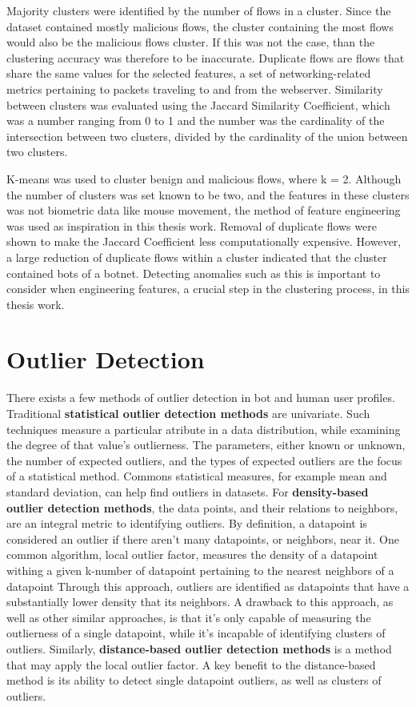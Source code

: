 Majority clusters were identified by the number of flows in a cluster.
Since the dataset contained mostly malicious flows, the cluster containing the most flows would also be the malicious flows cluster.
If this was not the case, than the clustering accuracy was therefore to be inaccurate.
Duplicate flows are flows that share the same values for the selected features, a set of networking-related metrics pertaining to packets traveling to and from the webserver.
Similarity between clusters was evaluated using the Jaccard Similarity Coefficient, which was a number ranging from 0 to 1 and the number was the cardinality of the intersection between two clusters, divided by the cardinality of the union between two clusters.

K-means was used to cluster benign and malicious flows, where k = 2.
Although the number of clusters was set known to be two, and the features in these clusters was not biometric data like mouse movement, the method of feature engineering was used as inspiration in this thesis work.
Removal of duplicate flows were shown to make the Jaccard Coefficient less computationally expensive.
However, a large reduction of duplicate flows within a cluster indicated that the cluster contained bots of a botnet.
Detecting anomalies such as this is important to consider when engineering features, a crucial step in the clustering process, in this thesis work.

\section{Outlier Detection}\label{sec:outlier-detection}
There exists a few methods of outlier detection in bot and human user profiles.
Traditional \textbf{statistical outlier detection methods} are univariate.
Such techniques measure a particular atribute in a data distribution, while examining the degree of that value's outlierness.
The parameters, either known or unknown, the number of expected outliers, and the types of expected outliers are the focus of a statistical method.
Commons statistical measures, for example mean and standard deviation, can help find outliers in datasets.
For \textbf{density-based outlier detection methods}, the data points, and their relations to neighbors, are an integral metric to identifying outliers.
By definition, a datapoint is considered an outlier if there aren't many datapoints, or neighbors, near it.
One common algorithm, local outlier factor, measures the density of a datapoint withing a given k-number of datapoint pertaining to the nearest neighbors of a datapoint
Through this approach, outliers are identified as datapoints that have a substantially lower density that its neighbors.
A drawback to this approach, as well as other similar approaches, is that it's only capable of measuring the outlierness of a single datapoint, while it's incapable of identifying clusters of outliers.
Similarly, \textbf{distance-based outlier detection methods} is a method that may apply the local outlier factor.
A key benefit to the distance-based method is its ability to detect single datapoint outliers, as well as clusters of outliers.

